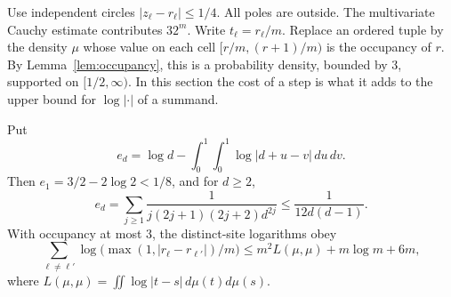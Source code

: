 Use independent circles \(|z_\ell-r_\ell|\le1/4\). All poles are outside. The multivariate Cauchy estimate contributes \(32^m\). Write \(t_\ell=r_\ell/m\). Replace an ordered tuple by the density \(\mu\) whose value on each cell \([r/m,(r+1)/m)\) is the occupancy of \(r\). By Lemma~\ref{lem:occupancy}, this is a probability density, bounded by 3, supported on \([1/2,\infty)\). In this section the cost of a step is what it adds to the upper bound for \(\log|\cdot|\) of a summand.

\begin{lemma}\label{lem:real-cell}
Put
\[
 e_d=\log d-\int_0^1\!\int_0^1\log|d+u-v|\,du\,dv.
\]
Then \(e_1=3/2-2\log2<1/8\), and for \(d\ge2\),
\[
 e_d=\sum_{j\ge1}\frac{1}{j(2j+1)(2j+2)d^{2j}}
 \le \frac{1}{12d(d-1)}.
\]
With occupancy at most 3, the distinct-site logarithms obey
\begin{equation}\label{eq:real-cell}
 \sum_{\ell\ne\ell'}\log\bigl(\max(1,|r_\ell-r_{\ell'}|)/m\bigr)
 \le m^2 L(\mu,\mu)+m\log m+6m,
\end{equation}
where \(L(\mu,\mu)=\iint\log|t-s|\,d\mu(t)d\mu(s)\).
\end{lemma}

